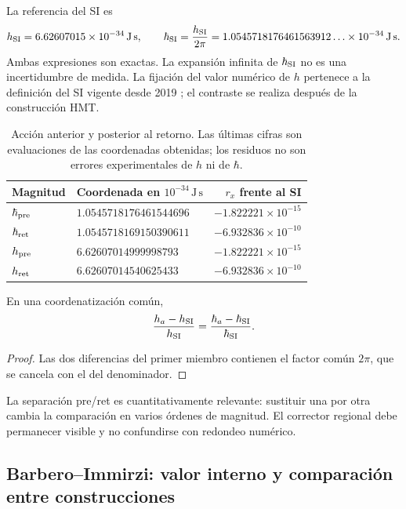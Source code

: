 La referencia del SI es
\[
 h_{\rm SI}=6.62607015\times10^{-34}\,\mathrm{J\,s},\qquad
 \hbar_{\rm SI}=\frac{h_{\rm SI}}{2\pi}
 =1.0545718176461563912\ldots\times10^{-34}\,\mathrm{J\,s}.
\]
Ambas expresiones son exactas. La expansión infinita de \(\hbar_{\rm SI}\)
no es una incertidumbre de medida. La fijación del valor numérico de
\(h\) pertenece a la definición del SI vigente desde 2019
\cite{bipm2018}; el contraste se realiza después de la construcción HMT.

\begin{table}[htbp]
\centering\small
\setlength{\tabcolsep}{5pt}
\begin{tabular}{@{}llr@{}}
\toprule
Magnitud & Coordenada en \(10^{-34}\,\mathrm{J\,s}\) & \(r_x\) frente al SI\\
\midrule
\(\hbar_{\rm pre}\) & \(1.0545718176461544696\) & \(-1.822221\times10^{-15}\)\\
\(\hbar_{\rm ret}\) & \(1.0545718169150390611\) & \(-6.932836\times10^{-10}\)\\
\(h_{\rm pre}\) & \(6.62607014999998793\) & \(-1.822221\times10^{-15}\)\\
\(h_{\rm ret}\) & \(6.62607014540625433\) & \(-6.932836\times10^{-10}\)\\
\bottomrule
\end{tabular}
\caption{Acción anterior y posterior al retorno. Las últimas cifras son
evaluaciones de las coordenadas obtenidas; los residuos no son errores
experimentales de \(h\) ni de \(\hbar\).}
\label{tab:ii-planck-comparacion}
\end{table}

\begin{proposition}
En una coordenatización común,
\[
 \frac{h_a-h_{\rm SI}}{h_{\rm SI}}
 =\frac{\hbar_a-\hbar_{\rm SI}}{\hbar_{\rm SI}}.
\]
\end{proposition}
\begin{proof}
Las dos diferencias del primer miembro contienen el factor común
\(2\pi\), que se cancela con el del denominador.
\end{proof}
La separación pre/ret es cuantitativamente relevante: sustituir una por
otra cambia la comparación en varios órdenes de magnitud. El corrector
regional debe permanecer visible y no confundirse con redondeo numérico.

\subsection{Barbero--Immirzi: valor interno y comparación entre construcciones}

